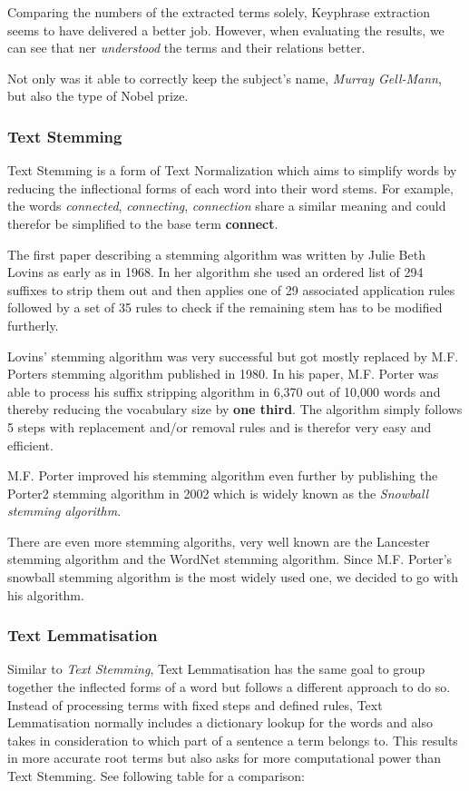 Comparing the numbers of the extracted terms solely, Keyphrase extraction seems to have delivered a better job.
However, when evaluating the results, we can see that \Gls{ner} \textit{understood} the terms and their
relations better.

Not only was it able to correctly keep the subject's name, \textit{Murray Gell-Mann}, but also the type of Nobel prize.


\subsubsection{Text Stemming}
Text Stemming is a form of Text Normalization which aims to simplify words
by reducing the inflectional forms of each word into their word stems.
For example, the words \textit{connected}, \textit{connecting}, \textit{connection} share a similar meaning and could
therefor be simplified to the base term \textbf{connect}.

The first paper describing a stemming algorithm was written by Julie Beth Lovins\cite{LovinsStemmer}
as early as in 1968.
In her algorithm she used an ordered list of 294 suffixes to strip them out and then applies one of
29 associated application rules followed by a set of 35 rules to check if the remaining stem has to be
modified furtherly.

Lovins' stemming algorithm was very successful but got mostly replaced by
M.F. Porters stemming algorithm\cite{PorterStemmerAlgorithm} published in 1980.
In his paper, M.F. Porter was able to process his suffix stripping algorithm in 6,370 out of 10,000 words and thereby
reducing the vocabulary size by \textbf{one third}.
The algorithm simply follows 5 steps with replacement and/or removal rules and is therefor very easy and efficient.

M.F. Porter improved his stemming algorithm even further by publishing the Porter2 stemming algorithm\cite{SnowballStemmerAlgorithm} in 2002
which is widely known as the \textit{Snowball stemming algorithm}.

There are even more stemming algoriths, very well known are the Lancester stemming algorithm\cite{LancesterStemmer}
and the WordNet stemming algorithm\cite{WordNetStemmer}.
Since M.F. Porter's snowball stemming algorithm is the most widely used one, we decided to go with his algorithm.

\subsubsection{Text Lemmatisation}
Similar to \textit{Text Stemming}, Text Lemmatisation has the same goal to group together the inflected forms of a word
but follows a different approach to do so.
Instead of processing terms with fixed steps and defined rules,
Text Lemmatisation normally includes a dictionary lookup for the words
and also takes in consideration to which part of a sentence a term belongs to.
This results in more accurate root terms but also asks for more computational power than Text Stemming.
See following table for a comparison:

